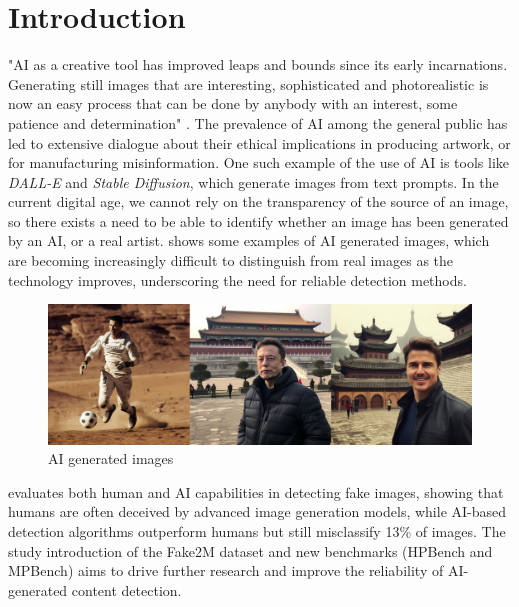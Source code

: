 \section{Introduction }

"AI as a creative tool has improved leaps and bounds since its early incarnations. Generating still images that are interesting, sophisticated and photorealistic is now an easy process that can be done by anybody with an interest, some patience and determination" \cite{scott2024ethics}. The prevalence of AI among the general public has led to extensive dialogue about their ethical implications in producing artwork, or for manufacturing misinformation. One such example of the use of AI is tools like \textit{DALL-E} and \textit{Stable Diffusion}, which generate images from text prompts. In the current digital age, we cannot rely on the transparency of the source of an image, so there exists a need to be able to identify whether an image has been generated by an AI, or a real artist.  shows some examples of AI generated images, which are becoming increasingly difficult to distinguish from real images as the technology improves, underscoring the need for reliable detection methods.

\begin{figure}[h]
    \centering
    \includegraphics[width=0.8 \linewidth]{figures/ai_generated_images_from_seeing_is_not_believing.png} %
    \centering
    \caption{AI generated images \cite{lu2023seeingbelievingbenchmarkinghuman}} %
    \label{fig:ai_generated_images} %
\end{figure}

\cite{lu2023seeingbelievingbenchmarkinghuman} evaluates both human and AI capabilities in detecting fake images, showing that humans are often deceived by advanced image generation models, while AI-based detection algorithms outperform humans but still misclassify 13\% of images. The study introduction of the Fake2M dataset and new benchmarks (HPBench and MPBench) aims to drive further research and improve the reliability of AI-generated content detection.

